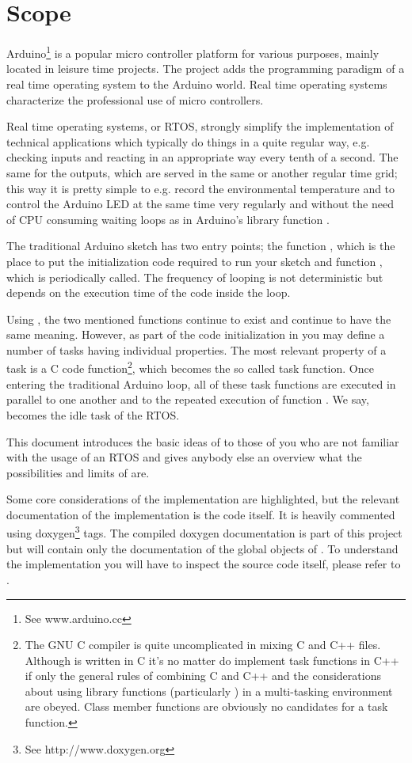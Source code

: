\chapter{Scope}
\label{secScope}

Arduino\footnote{See www.arduino.cc} is a popular micro controller
platform for various purposes, mainly located in leisure time projects.
The \rtos{} project adds the programming paradigm of a real time operating
system to the Arduino world. Real time operating systems characterize the
professional use of micro controllers.

Real time operating systems, or RTOS, strongly simplify the implementation
of technical applications which typically do things in a quite regular
way, e.g. checking inputs and reacting in an appropriate way every tenth
of a second. The same for the outputs, which are served in the same or
another regular time grid; this way it is pretty simple to e.g. record the
environmental temperature and to control the Arduino LED at the same time
very regularly and without the need of CPU consuming waiting loops as
in Arduino's library function .

The traditional Arduino sketch has two entry points; the function
, which is the place to put the initialization code required
to run your sketch and function , which is periodically
called. The frequency of looping is not deterministic but depends on
the execution time of the code inside the loop.

Using \rtos{}, the two mentioned functions continue to exist and continue
to have the same meaning. However, as part of the code initialization in
 you may define a number of tasks having individual
properties. The most relevant property of a task is a C code
function\footnote{The GNU C compiler is quite uncomplicated in mixing C
and C++ files. Although \rtos{} is written in C it's no matter do
implement task functions in C++ if only the general rules of combining C
and C++ and the considerations about using library functions (particularly
) in a multi-tasking environment are obeyed. Class member
functions are obviously no candidates for a task function.}, which becomes
the so called task function. Once entering the traditional Arduino loop,
all of these task functions are executed in parallel to one another and to
the repeated execution of function . We say, 
becomes the idle task of the RTOS.

This document introduces the basic ideas of \rtos{} to those of you who are
not familiar with the usage of an RTOS and gives anybody else an overview
what the possibilities and limits of \rtos{} are.

Some core considerations of the implementation are highlighted, but the
relevant documentation of the implementation is the code itself. It is
heavily commented using doxygen\footnote{See http://www.doxygen.org} tags.
The compiled doxygen documentation is part of this project but will
contain only the documentation of the global objects of \rtos. To
understand the implementation you will have to inspect the source code
itself, please refer to .

